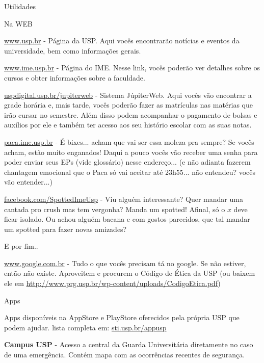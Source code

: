 \begin{secao}{Utilidades}

\begin{subsecao}{Na WEB}

\url{www.usp.br} - Página da USP. Aqui vocês encontrarão notícias e eventos da
universidade, bem como informações gerais.

\url{www.ime.usp.br} - Página do IME.
Nesse link, vocês poderão ver detalhes sobre os cursos e obter informações sobre
a faculdade.

\url{uspdigital.usp.br/jupiterweb} - Sistema JúpiterWeb. Aqui vocês vão
encontrar a grade horária e, mais tarde, vocês poderão fazer as matrículas nas
matérias que irão cursar no semestre. Além disso podem acompanhar o pagamento de
bolsas e auxílios por ele e também ter acesso aos seu histório escolar com as suas notas.

\url{paca.ime.usp.br} - É bixes... acham que vai ser essa moleza pra sempre? Se
vocês acham, estão muito enganados! Daqui a pouco vocês vão receber uma senha para
poder enviar seus EPs (vide glossário) nesse endereço... (e não adianta fazerem
chantagem emocional que o Paca só vai aceitar até 23h55... não entendeu? vocês
vão entender...)

\url{facebook.com/SpottedImeUsp} - Viu alguém interessante? Quer mandar uma cantada
pro crush mas tem vergonha? Manda um spotted! Afinal, só o $x$ deve ficar isolado.
Ou achou alguém bacana e com gostos parecidos, que tal mandar um spotted para 
fazer novas amizades? 


E por fim..

\url{ www.google.com.br} - Tudo o que vocês precisam tá no google. Se não estiver,
então não existe. Aproveitem e procurem o Código de Ética da USP (ou baixem ele em
\url{http://www.prg.usp.br/wp-content/uploads/CodigoEtica.pdf})

\end{subsecao}

\begin{subsecao}{Apps}
	
Apps disponíveis na AppStore e PlayStore oferecidos pela própria USP que podem ajudar. lista completa em: \url{sti.usp.br/appusp}

{\bf Campus USP} - Acesso a central da Guarda Universitária diretamente no caso de uma emergência. Contém mapa com as ocorrências recentes de segurança. 


\end{subsecao}
\end{secao}

